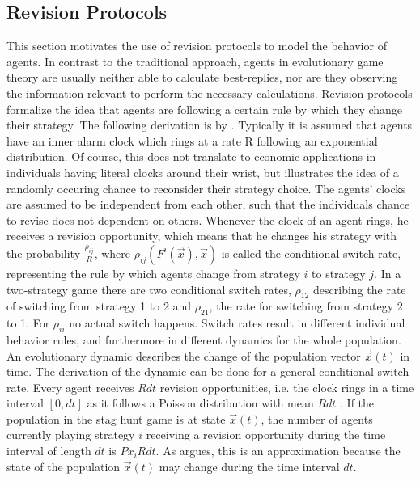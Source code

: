 \subsection{Revision Protocols}
\label{sec:revisionprotocols}
This section motivates the use of revision protocols to
model the behavior of agents.
In contrast to the traditional approach, agents in evolutionary game theory 
are usually neither able to calculate best-replies, 
nor are they observing the information relevant
to perform the necessary calculations.
Revision protocols formalize the idea that agents are following a certain
rule by which they change their strategy. 
The following derivation is by \textcite{sandholm_population_2010}. 
Typically it is assumed that agents have an inner alarm clock 
which rings at a rate R following an exponential distribution. 
Of course, this does not translate 
to economic applications in individuals having literal clocks around their
wrist, but illustrates the idea of a randomly occuring chance to reconsider
their strategy choice.
The agents' clocks are assumed to be independent from each other, such that
the individuals chance to revise does not dependent on others.
Whenever the clock of an agent rings, he
receives a revision opportunity, which means that he changes his strategy
with the probability $\frac{\rho_{ij}}{R}$, where
$\rho_{ij}(F^i(\vec{x}),\vec{x})$ is called the conditional switch rate,
representing the rule by which agents change from strategy 
$i$ to strategy $j$. 
In a two-strategy game there are two conditional switch rates, $\rho_{12}$ 
describing the rate of switching from strategy 1 to 2 and $\rho_{21}$, 
the rate for switching from strategy 2 to 1. For $\rho_{ii}$ no actual switch 
happens.
Switch rates result in different individual behavior rules, and furthermore 
in different dynamics for the whole population. An evolutionary
dynamic describes the change of the population vector $\vec{x}(t)$ in time. 
The derivation of the dynamic can be done for a general conditional switch 
rate.
Every agent receives $R dt$ revision opportunities, i.e. the clock rings 
in a time interval $[0,dt]$ as it follows a Poisson distribution with
mean $Rdt$ \parencite[123]{sandholm_population_2010}. 
If the population in the stag hunt game is at state $\vec{x}(t)$, the number 
of agents currently playing strategy $i$ receiving a revision opportunity 
during the time interval of length $dt$ is $Px_i R dt$. As 
\textcite{sandholm_population_2010} argues, this is an approximation because
the state of the population $\vec{x}(t)$ may change during the time interval $dt$.

